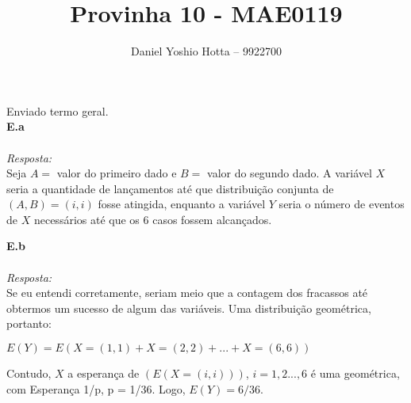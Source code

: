 \documentclass{article}
\begin{document}
	
	\title{Provinha 10 - MAE0119}
	\author{Daniel Yoshio Hotta – 9922700}
	
	\maketitle	
	
	Enviado termo geral.\\
	
	\textbf {E.a} 
	\\ \\
	\textit {Resposta:} \\
    
    Seja $A =$ valor do primeiro dado e $B =$ valor do segundo dado. A variável $X$ seria a quantidade de lançamentos até que distribuição conjunta de $(A, B) = (i, i)$ fosse atingida, enquanto a variável $Y$ seria o número de eventos de $X$ necessários até que os 6 casos fossem alcançados. 
    
    \textbf {E.b} 
    \\ \\
    \textit {Resposta:} \\
    
    Se eu entendi corretamente, seriam meio que a contagem dos fracassos até obtermos um sucesso de algum das variáveis. Uma distribuição geométrica, portanto:
    
    \begin{center}
    	$E(Y) = E(X = (1, 1) + X = (2,2) + ... + X = (6, 6))$
    \end{center}

    Contudo, $X$ a esperança de $(E(X = (i, i)))$, $i = {1, 2..., 6}$ é uma geométrica, com Esperança 1/p, p = 1/36. Logo, $E(Y) = 6 /36$.
\end{document}
